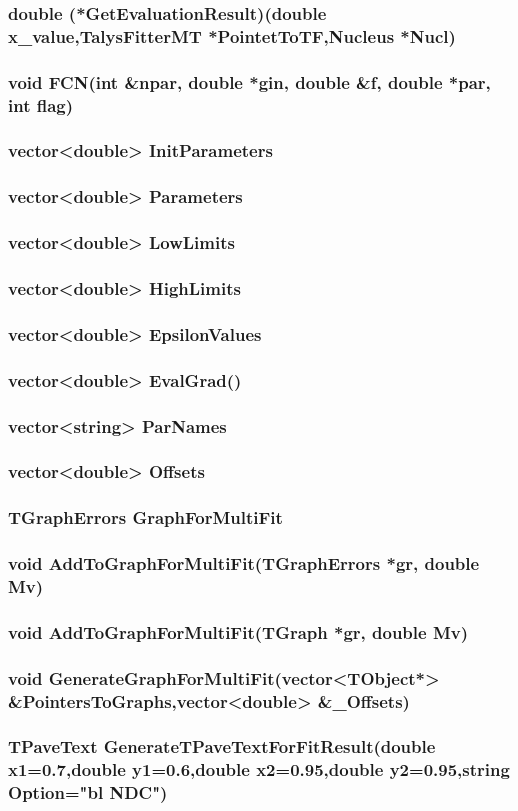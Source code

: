 \documentclass[a4paper,12pt]{extarticle}
\begin{document}
\subsubsection{double (*GetEvaluationResult)(double x_value,TalysFitterMT *PointetToTF,Nucleus *Nucl)}
\subsubsection{void FCN(int \textbf{\&}npar, double *gin, double \textbf{\&}f, double *par, int flag)}
\subsubsection{vector<double> InitParameters}
\subsubsection{vector<double> Parameters}
\subsubsection{vector<double> LowLimits}
\subsubsection{vector<double> HighLimits}
\subsubsection{vector<double> EpsilonValues}
\subsubsection{vector<double> EvalGrad()}
\subsubsection{vector<string> ParNames}
\subsubsection{vector<double> Offsets}
\subsubsection{TGraphErrors GraphForMultiFit}
\subsubsection{void AddToGraphForMultiFit(TGraphErrors *gr, double Mv)}
\subsubsection{void AddToGraphForMultiFit(TGraph *gr, double Mv)}
\subsubsection{void GenerateGraphForMultiFit(vector<TObject*> \textbf{\&}PointersToGraphs,vector<double> \textbf{\&}_Offsets)}
\subsubsection{TPaveText GenerateTPaveTextForFitResult(double x1=0.7,double y1=0.6,double x2=0.95,double y2=0.95,string Option="bl NDC")}
\end{document}
